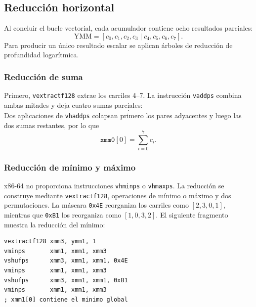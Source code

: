 \documentclass[journal]{IEEEtran}
\begin{document}
\subsection{Reducción horizontal}

Al concluir el bucle vectorial, cada acumulador contiene ocho resultados
parciales:
\begin{equation}
  \mathrm{YMM}=[c_0,c_1,c_2,c_3\mid c_4,c_5,c_6,c_7].
  \label{eq:partial-lanes}
\end{equation}
Para producir un único resultado escalar se aplican árboles de reducción de
profundidad logarítmica.

\subsubsection{Reducción de suma}

Primero, \texttt{vextractf128} extrae los carriles 4--7. La instrucción
\texttt{vaddps} combina ambas mitades y deja cuatro sumas parciales:
\begin{equation}
  [c_0+c_4,\;c_1+c_5,\;c_2+c_6,\;c_3+c_7].
  \label{eq:sum-halves}
\end{equation}
Dos aplicaciones de \texttt{vhaddps} colapsan primero los pares adyacentes y
luego las dos sumas restantes, por lo que
\begin{equation}
  \texttt{xmm0}[0]=\sum_{i=0}^{7}c_i.
  \label{eq:horizontal-sum}
\end{equation}

\subsubsection{Reducción de mínimo y máximo}

x86-64 no proporciona instrucciones \texttt{vhminps} o \texttt{vhmaxps}. La
reducción se construye mediante \texttt{vextractf128}, operaciones de mínimo o
máximo y dos permutaciones. La máscara \texttt{0x4E} reorganiza los carriles
como $[2,3,0,1]$, mientras que \texttt{0xB1} los reorganiza como
$[1,0,3,2]$. El siguiente fragmento muestra la reducción del mínimo:

\begin{lstlisting}[language={[x86masm]Assembler},caption={Árbol horizontal para reducir el mínimo.},label={lst:reduce-min}]
vextractf128 xmm3, ymm1, 1
vminps       xmm1, xmm1, xmm3
vshufps      xmm3, xmm1, xmm1, 0x4E
vminps       xmm1, xmm1, xmm3
vshufps      xmm3, xmm1, xmm1, 0xB1
vminps       xmm1, xmm1, xmm3
; xmm1[0] contiene el minimo global
\end{lstlisting}
\end{document}
